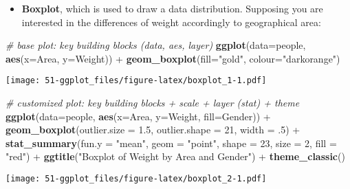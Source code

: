 \documentclass[]{book}
\newenvironment{Shaded}{\begin{snugshade}}{\end{snugshade}}
\newcommand{\KeywordTok}[1]{\textcolor[rgb]{0.13,0.29,0.53}{\textbf{{#1}}}}
\newcommand{\DataTypeTok}[1]{\textcolor[rgb]{0.13,0.29,0.53}{{#1}}}
\newcommand{\DecValTok}[1]{\textcolor[rgb]{0.00,0.00,0.81}{{#1}}}
\newcommand{\FloatTok}[1]{\textcolor[rgb]{0.00,0.00,0.81}{{#1}}}
\newcommand{\StringTok}[1]{\textcolor[rgb]{0.31,0.60,0.02}{{#1}}}
\newcommand{\CommentTok}[1]{\textcolor[rgb]{0.56,0.35,0.01}{\textit{{#1}}}}
\newcommand{\NormalTok}[1]{{#1}}
\providecommand{\tightlist}{%
  \setlength{\itemsep}{0pt}\setlength{\parskip}{0pt}}
\def\tightlist{}
\begin{document}
\clearpage

\begin{itemize}
\tightlist
\item
  \textbf{Boxplot}, which is used to draw a data distribution. Supposing
  you are interested in the differences of weight accordingly to
  geographical area:
\end{itemize}

\begin{Shaded}
\begin{Highlighting}[]
\CommentTok{# base plot: key building blocks (data, aes, layer)}
\KeywordTok{ggplot}\NormalTok{(}\DataTypeTok{data=}\NormalTok{people, }\KeywordTok{aes}\NormalTok{(}\DataTypeTok{x=}\NormalTok{Area, }\DataTypeTok{y=}\NormalTok{Weight)) +}\StringTok{ }
\StringTok{  }\KeywordTok{geom_boxplot}\NormalTok{(}\DataTypeTok{fill=}\StringTok{"gold"}\NormalTok{, }\DataTypeTok{colour=}\StringTok{"darkorange"}\NormalTok{) }
\end{Highlighting}
\end{Shaded}

\texttt{[image: 51-ggplot\_files/figure-latex/boxplot\_1-1.pdf]}

\clearpage

\begin{Shaded}
\begin{Highlighting}[]
\CommentTok{# customized plot: key building blocks + scale + layer (stat) + theme }
\KeywordTok{ggplot}\NormalTok{(}\DataTypeTok{data=}\NormalTok{people, }\KeywordTok{aes}\NormalTok{(}\DataTypeTok{x=}\NormalTok{Area, }\DataTypeTok{y=}\NormalTok{Weight, }\DataTypeTok{fill=}\NormalTok{Gender)) +}\StringTok{ }
\StringTok{  }\KeywordTok{geom_boxplot}\NormalTok{(}\DataTypeTok{outlier.size =} \FloatTok{1.5}\NormalTok{, }\DataTypeTok{outlier.shape =} \DecValTok{21}\NormalTok{, }\DataTypeTok{width =} \NormalTok{.}\DecValTok{5}\NormalTok{) +}\StringTok{ }
\StringTok{  }\KeywordTok{stat_summary}\NormalTok{(}\DataTypeTok{fun.y =} \StringTok{"mean"}\NormalTok{, }\DataTypeTok{geom =} \StringTok{"point"}\NormalTok{, }\DataTypeTok{shape =} \DecValTok{23}\NormalTok{, }\DataTypeTok{size =} \DecValTok{2}\NormalTok{, }\DataTypeTok{fill =} \StringTok{"red"}\NormalTok{) +}\StringTok{ }
\StringTok{  }\KeywordTok{ggtitle}\NormalTok{(}\StringTok{"Boxplot of Weight by Area and Gender"}\NormalTok{) +}\StringTok{ }
\StringTok{  }\KeywordTok{theme_classic}\NormalTok{() }
\end{Highlighting}
\end{Shaded}

\texttt{[image: 51-ggplot\_files/figure-latex/boxplot\_2-1.pdf]}
\end{document}
